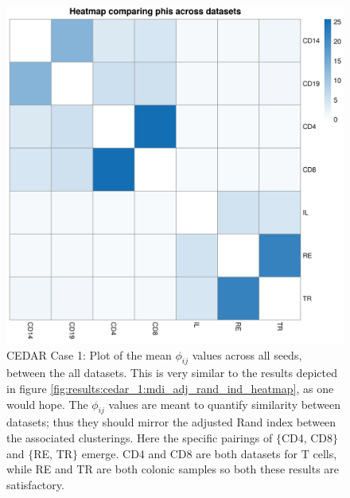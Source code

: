 \documentclass[12pt]{article} %
\begin{document}
	
	\begin{figure}[h]
		\centering
		\includegraphics[scale=0.75]{Images/Biology_data/Set_250/All_datasets/Phi_heatmap_1.png}
		\caption{CEDAR Case 1: Plot of the mean $\phi_{ij}$ values across all seeds, between the all datasets. This is very similar to the results depicted in figure \ref{fig:results:cedar_1:mdi_adj_rand_ind_heatmap}, as one would hope. The $\phi_{ij}$ values are meant to quantify similarity between datasets; thus they should mirror the adjusted Rand index between the associated clusterings. Here the specific pairings of $\{$CD4, CD8$\}$ and $\{$RE, TR$\}$ emerge. CD4 and CD8 are both datasets for T cells, while RE and TR are both colonic samples so both these results are satisfactory.}
		\label{fig:results:cedar_1:mdi_phi_heatmap}
	\end{figure}
	
	\newpage
\end{document}
